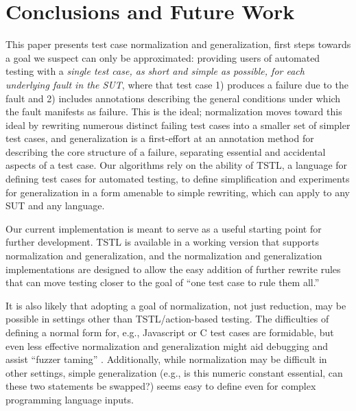 \section{Conclusions and Future Work}

This paper presents test case normalization and generalization, first
steps towards a goal we suspect can only be approximated: providing
users of automated testing with a \emph{single test case, as short and
  simple as possible, for each underlying fault in the SUT}, where
that test case 1) produces a failure due to the fault and 2) includes
annotations describing the general conditions under which the fault
manifests as failure.  This is the ideal; normalization moves toward
this ideal by rewriting numerous distinct failing test cases into a
smaller set of simpler test cases, and generalization is a
first-effort at an annotation method for describing the core structure
of a failure, separating essential and accidental aspects of a test
case.  Our algorithms rely on the ability of TSTL, a language for
defining test cases for automated testing, to define simplification
and experiments for generalization in a form amenable to simple
rewriting, which can apply to any SUT and any language.

Our current implementation is meant to serve as a useful starting
point for further development.  TSTL is available in a working version
\cite{tstl} that supports normalization and generalization, and the
normalization and generalization implementations are designed to allow
the easy addition of further rewrite rules that can move testing closer to
the goal of ``one test case to rule them all.''

It is also likely that adopting a goal of normalization, not just
reduction, may be possible in settings other than TSTL/action-based
testing.  The difficulties of defining a normal form for, e.g.,
Javascript \cite{jsfunfuzz} or C \cite{CReduce} test cases are
formidable, but even less effective normalization and generalization
might aid debugging and assist ``fuzzer taming'' \cite{PLDI13}.  Additionally, while
normalization may be difficult in other settings, simple
generalization (e.g., is this numeric constant essential, can these
two statements be swapped?) seems easy to define even for complex
programming language inputs.

